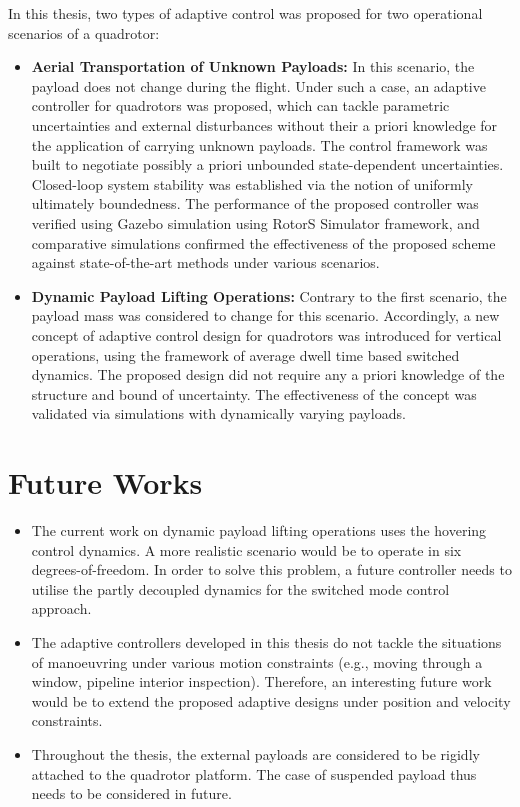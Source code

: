 In this thesis, two types of adaptive control was proposed for two operational scenarios of a quadrotor: 
\begin{itemize}
    \item \textbf{Aerial Transportation of Unknown Payloads:} In this scenario, the payload does not change during the flight. Under such a case, an adaptive controller for quadrotors was proposed, which can tackle parametric uncertainties and external disturbances without their a priori knowledge for the application of carrying unknown payloads. The control framework was built to negotiate possibly a priori unbounded state-dependent uncertainties. Closed-loop system stability was established via the notion of uniformly ultimately boundedness. The performance of the proposed controller was verified using Gazebo simulation using RotorS Simulator framework, and comparative simulations confirmed the effectiveness of the proposed scheme against state-of-the-art methods under various scenarios.

\item \textbf{Dynamic Payload Lifting Operations:} Contrary to the first scenario, the payload mass was considered to change for this scenario. Accordingly, a new concept of adaptive control design for quadrotors was introduced for vertical operations, using the framework of average dwell time based switched dynamics. The proposed design did not require any a priori knowledge of the structure and bound of uncertainty. The effectiveness of the concept was validated via simulations with dynamically varying payloads.
\end{itemize}




\section{Future Works}
\begin{itemize}
    \item The current work on dynamic payload lifting operations uses the hovering control dynamics. A more realistic scenario would be to operate in six degrees-of-freedom. In order to solve this problem, a future controller needs to utilise the partly decoupled dynamics for the switched mode control approach.
    
    \item The adaptive controllers developed in this thesis do not tackle the situations of manoeuvring under various motion constraints (e.g., moving through a window, pipeline interior inspection). Therefore, an interesting future work would be to extend the proposed adaptive designs under position and velocity constraints. %
    
    \item Throughout the thesis, the external payloads are considered to be rigidly attached to the quadrotor platform. The case of suspended payload thus needs to be considered in future. 
\end{itemize}
 